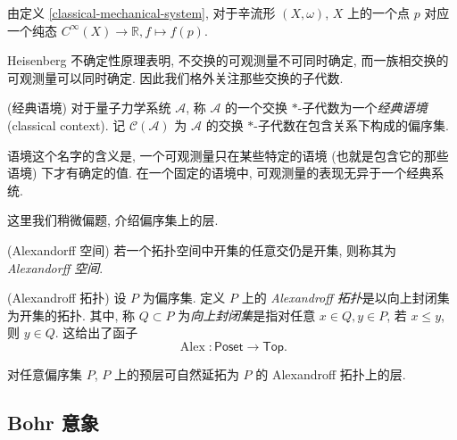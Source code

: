 \begin{example}
	{}
	由定义 \ref{classical-mechanical-system}, 对于辛流形 $(X,\omega)$, $X$ 上的一个点 $p$ 对应一个纯态 $C^\infty (X)\to\mathbb{R},f\mapsto f(p)$.
\end{example}

Heisenberg 不确定性原理表明, 不交换的可观测量不可同时确定, 而一族相交换的可观测量可以同时确定. 因此我们格外关注那些交换的子代数.

\begin{definition}
    {(经典语境)}
    对于量子力学系统 $\mathcal A$, 称 $\mathcal A$ 的一个交换 $*$-子代数为一个\emph{经典语境} (classical context).
    记 $\mathcal C(\mathcal A)$ 为 $\mathcal A$ 的交换 $*$-子代数在包含关系下构成的偏序集.
\end{definition}

\begin{remark}
    {}
    语境这个名字的含义是, 一个可观测量只在某些特定的语境 (也就是包含它的那些语境) 下才有确定的值. 在一个固定的语境中, 可观测量的表现无异于一个经典系统.
\end{remark}

这里我们稍微偏题, 介绍偏序集上的层.


\begin{definition}
    {(Alexandorff 空间)}
    若一个拓扑空间中开集的任意交仍是开集, 则称其为 \emph{Alexandorff 空间}.
\end{definition}

\begin{definition}
    {(Alexandroff 拓扑)}
    设 $P$ 为偏序集. 定义 $P$ 上的 \emph{Alexandroff 拓扑}是以向上封闭集为开集的拓扑. 其中, 称 $Q\subset P$ 为\emph{向上封闭集}是指对任意 $x\in Q,y\in P$, 若 $x\leq y$, 则 $y\in Q$. 这给出了函子
    \[
    \operatorname{Alex}\colon \mathsf {Poset} \to \mathsf {Top}.
    \]
\end{definition}

\begin{prop}
    {}
    对任意偏序集 $P$, $P$ 上的预层可自然延拓为 $P$ 的 Alexandroff 拓扑上的层.
\end{prop}

%

\subsection{Bohr 意象}

